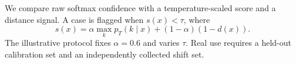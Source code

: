 We compare raw softmax confidence with a temperature-scaled score and a distance signal. A case is flagged when $s(x)<\tau$, where
\[s(x)=\alpha\max_k p_T(k\mid x)+(1-\alpha)(1-d(x)).\]
The illustrative protocol fixes $\alpha=0.6$ and varies $\tau$. Real use requires a held-out calibration set and an independently collected shift set.
